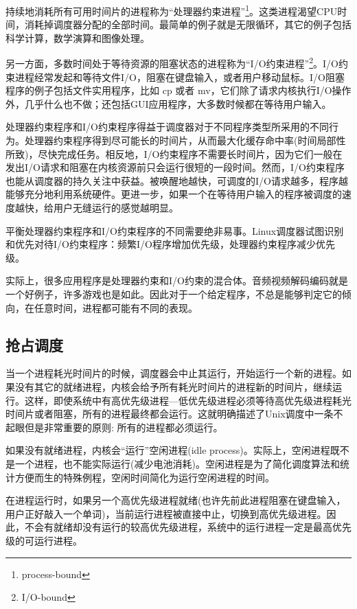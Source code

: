 持续地消耗所有可用时间片的进程称为“处理器约束进程”\footnote[1]{process-bound}。这类进程渴望CPU时间，消耗掉调度器分配的全部时间。最简单的例子就是无限循环，其它的例子包括科学计算，数学演算和图像处理。

另一方面，多数时间处于等待资源的阻塞状态的进程称为“I/O约束进程”\footnote[2]{I/O-bound}。I/O约束进程经常发起和等待文件I/O，阻塞在键盘输入，或者用户移动鼠标。I/O阻塞程序的例子包括文件实用程序，比如 cp 或者 mv，它们除了请求内核执行I/O操作外，几乎什么也不做；还包括GUI应用程序，大多数时候都在等待用户输入。

处理器约束程序和I/O约束程序得益于调度器对于不同程序类型所采用的不同行为。处理器约束程序得到尽可能长的时间片，从而最大化缓存命中率(时间局部性所致)，尽快完成任务。相反地，I/O约束程序不需要长时间片，因为它们一般在发出I/O请求和阻塞在内核资源前只会运行很短的一段时间。然而，I/O约束程序也能从调度器的持久关注中获益。被唤醒地越快，可调度的I/O请求越多，程序越能够充分地利用系统硬件。更进一步，如果一个在等待用户输入的程序被调度的速度越快，给用户无缝运行的感觉越明显。

平衡处理器约束程序和I/O约束程序的不同需要绝非易事。Linux调度器试图识别和优先对待I/O约束程序：频繁I/O程序增加优先级，处理器约束程序减少优先级。

实际上，很多应用程序是处理器约束和I/O约束的混合体。音频视频解码编码就是一个好例子，许多游戏也是如此。因此对于一个给定程序，不总是能够判定它的倾向，在任意时间，进程都可能有不同的表现。

\subsection{抢占调度}

当一个进程耗光时间片的时候，调度器会中止其运行，开始运行一个新的进程。如果没有其它的就绪进程，内核会给予所有耗光时间片的进程新的时间片，继续运行。这样，即使系统中有高优先级进程---低优先级进程必须等待高优先级进程耗光时间片或者阻塞，所有的进程最终都会运行。这就明确描述了Unix调度中一条不起眼但是非常重要的原则: 所有的进程都必须运行。

如果没有就绪进程，内核会“运行”空闲进程(idle process)。实际上，空闲进程既不是一个进程，也不能实际运行(减少电池消耗)。空闲进程是为了简化调度算法和统计方便而生的特殊例程，空闲时间简化为运行空闲进程的时间。

在进程运行时，如果另一个高优先级进程就绪(也许先前此进程阻塞在键盘输入，用户正好敲入一个单词)，当前运行进程被直接中止，切换到高优先级进程。因此，不会有就绪却没有运行的较高优先级进程，系统中的运行进程一定是最高优先级的可运行进程。

